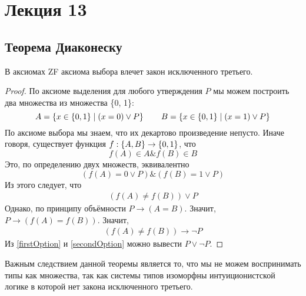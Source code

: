 \section{Лекция 13}

\subsection{Теорема Диаконеску}
\begin{theorem}[Диаконеску]
    В аксиомах ZF аксиома выбора влечет закон исключенного третьего.
\end{theorem}

\begin{proof}

По аксиоме выделения для любого утверждения $P$ мы можем построить два множества из множества \{0, 1\}:
\[
    A = \left\{x \in \left\{0, 1\right\} \mid \left(x = 0\right) \lor P\right\} \qquad
    B = \left\{x \in \left\{0, 1\right\} \mid \left(x = 1\right) \lor P\right\}
\]
По аксиоме выбора мы знаем, что их декартово произведение непусто.
Иначе говоря, существует функция $f : \left\{A, B\right\} \to \left\{0, 1\right\}$, что
\[
    f(A) \in A \& f(B) \in B
\]
Это, по определению двух множеств, эквивалентно
\[
    \left(f(A) = 0 \vee P\right) \& \left(f(B) = 1 \vee P\right)
\]
Из этого следует, что
\begin{gather}
    \left(f(A) \neq f(B)\right) \vee P \label{firstOption} \tag{$*$}
\end{gather}
Однако, по принципу объёмности $P \to \left(A=B\right)$. Значит, $P \to \left(f(A) = f(B)\right)$. Значит,
\begin{gather}
    \left(f(A) \neq f(B)\right) \to \neg P \label{secondOption} \tag{$**$}
\end{gather}
Из \ref{firstOption} и \ref{secondOption} можно вывести $P \vee \neg P$.

\end{proof}

Важным следствием данной теоремы является то, что мы не можем воспринимать типы как множества, так как системы типов изоморфны интуиционистской логике в которой нет закона исключенного третьего.
